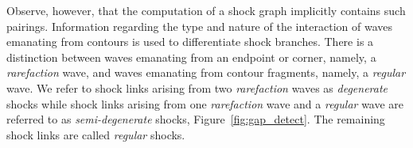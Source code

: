 

Observe, however, that the computation of a shock graph implicitly contains such pairings. Information regarding the type and nature of the interaction of waves emanating from contours is used to differentiate shock branches. There is a distinction between waves emanating from an endpoint or corner, namely, a \emph{rarefaction} wave, and waves emanating from contour fragments, namely, a \emph{regular} wave. We refer to shock links arising from two \emph{rarefaction}  waves as \emph{degenerate} shocks while shock links arising from one \emph{rarefaction} wave and a \emph{regular} wave are referred to as \emph{semi-degenerate} shocks, Figure~\ref{fig:gap_detect}. The remaining shock links are called \emph{regular} shocks.

